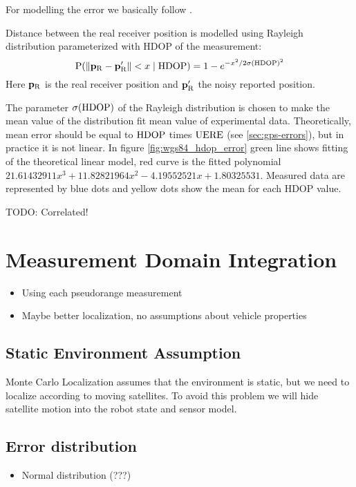For modelling the error we basically follow \cite{www-wilson}.

Distance between the real receiver position is modelled using Rayleigh distribution
parameterized with HDOP of the measurement:
\begin{equation}
	\operatorname{\mathrm{P}}(\|\mathbf{p_\mathrm{R}} - \mathbf{p'_\mathrm{R}}\| < x \mid \mathrm{HDOP}) =
		1 - e^{-x^2/2\sigma(\mathrm{HDOP})^2}
\end{equation}
Here \(\mathbf{p_\mathrm{R}}\) is the real receiver position and \(\mathbf{p'_\mathrm{R}}\)
the noisy reported position.

The parameter \(\sigma(\mathrm{HDOP})\) of the Rayleigh distribution is chosen to make the
mean value of the distribution fit mean value of experimental data.
Theoretically, mean error should be equal to \(\mathrm{HDOP}\) times \(\mathrm{UERE}\) (see \ref{sec:gps-errors}),
but in practice it is not linear.
In figure \ref{fig:wgs84_hdop_error} green line shows fitting of the theoretical linear model,
red curve is the fitted polynomial \(\num{21.61432911}x^3 + \num{11.82821964}x^2 - 
\num{4.19552521}x + \num{1.80325531}\).
Measured data are represented by blue dots and yellow dots show the mean for each HDOP value.

TODO: Correlated!

\section{Measurement Domain Integration}
\label{sec:measurement_domain}
\begin{itemize}
\item Using each pseudorange measurement
\item Maybe better localization, no assumptions about vehicle properties
\end{itemize}

\subsection{Static Environment Assumption}
\label{sec:gps-mcl-static-env}
Monte Carlo Localization assumes that the environment is static, but we need to
localize according to moving satellites.
To avoid this problem we will hide satellite motion into the robot state and sensor model.

\subsection{Error distribution}
\begin{itemize}
\item Normal distribution (???)
\end{itemize}

